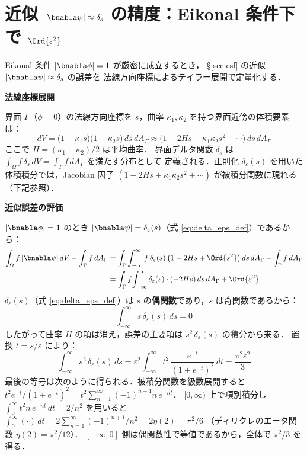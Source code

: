 \section{\texorpdfstring{近似 $|\bnabla\psi| \approx \delta_s$ の精度：Eikonal 条件下で $\Ord{\varepsilon^2}$}{近似 |∇ψ|≈δ\_s の精度：Eikonal 条件下で O(ε²)}}
\label{app:csf_delta_precision}

Eikonal 条件 $|\bnabla\phi|=1$ が厳密に成立するとき，
§\ref{sec:csf} の近似 $|\bnabla\psi| \approx \delta_s$ の誤差を
法線方向座標によるテイラー展開で定量化する．

\medskip
\noindent\textbf{法線座標展開}

界面 $\Gamma$（$\phi=0$）の法線方向座標を $s$，曲率 $\kappa_1, \kappa_2$ を持つ界面近傍の体積要素は：
\[
  dV = \bigl(1 - \kappa_1 s\bigr)\bigl(1 - \kappa_2 s\bigr)\, ds\, dA_\Gamma
  \approx \bigl(1 - 2H s + \kappa_1\kappa_2 s^2 + \cdots\bigr)\, ds\, dA_\Gamma
\]
ここで $H = (\kappa_1+\kappa_2)/2$ は平均曲率．
界面デルタ関数 $\delta_s$ は $\int_\Omega f\,\delta_s\,dV = \int_\Gamma f\,dA_\Gamma$ を満たす分布として
定義される．正則化 $\delta_\varepsilon(s)$ を用いた体積積分では，Jacobian 因子
$(1 - 2Hs + \kappa_1\kappa_2 s^2 + \cdots)$ が被積分関数に現れる（下記参照）．

\noindent\textbf{近似誤差の評価}

$|\bnabla\phi|=1$ のとき $|\bnabla\psi| = \delta_\varepsilon(s)$（式 \eqref{eq:delta_eps_def}）であるから：
\begin{align*}
  \int_\Omega f\,|\bnabla\psi|\,dV - \int_\Gamma f\,dA_\Gamma
  &= \int_\Gamma \int_{-\infty}^{\infty}
       f\,\delta_\varepsilon(s)\,\bigl(1 - 2Hs + \Ord{s^2}\bigr)\,ds\, dA_\Gamma
     - \int_\Gamma f\, dA_\Gamma \\
  &= \int_\Gamma f\!\int_{-\infty}^{\infty}\delta_\varepsilon(s)\cdot(-2Hs)\,ds\, dA_\Gamma
     + \Ord{\varepsilon^2}
\end{align*}
$\delta_\varepsilon(s)$（式 \eqref{eq:delta_eps_def}）は $s$ の\textbf{偶関数}であり，$s$ は奇関数であるから：
\[
  \int_{-\infty}^{\infty} s\,\delta_\varepsilon(s)\,ds = 0
\]
したがって曲率 $H$ の項は消え，誤差の主要項は $s^2\,\delta_\varepsilon(s)$ の積分から来る．
置換 $t = s/\varepsilon$ により：
\[
  \int_{-\infty}^{\infty} s^2\,\delta_\varepsilon(s)\,ds
  = \varepsilon^2 \int_{-\infty}^{\infty} t^2\,\frac{e^{-t}}{(1+e^{-t})^2}\,dt
  = \frac{\pi^2\varepsilon^2}{3}
\]
最後の等号は次のように得られる．被積分関数を級数展開すると
$t^2 e^{-t}/(1+e^{-t})^2 = t^2 \sum_{n=1}^{\infty}(-1)^{n+1} n\,e^{-nt}$．
$[0,\infty)$ 上で項別積分し $\int_0^\infty t^2 n\,e^{-nt}\,dt = 2/n^2$ を用いると
$\int_0^\infty (\cdot)\,dt = 2\sum_{n=1}^{\infty}(-1)^{n+1}/n^2 = 2\eta(2) = \pi^2/6$
（ディリクレのエータ関数 $\eta(2) = \pi^2/12$）．
$[-\infty,0]$ 側は偶関数性で等値であるから，全体で $\pi^2/3$ を得る．

